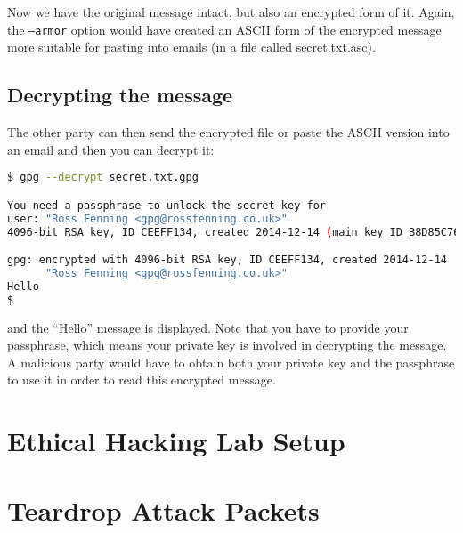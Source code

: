 \documentclass{report}
\begin{document}
Now we have the original message intact, but also an encrypted form of it.
Again, the \texttt{--armor} option would have created an ASCII form of
the encrypted message more suitable for pasting into emails (in a file
called secret.txt.asc).

\section{Decrypting the message}

The other party can then send the encrypted file or paste the ASCII version into
an email and then you can decrypt it:

\begin{lstlisting}[language=bash]
$ gpg --decrypt secret.txt.gpg

You need a passphrase to unlock the secret key for
user: "Ross Fenning <gpg@rossfenning.co.uk>"
4096-bit RSA key, ID CEEFF134, created 2014-12-14 (main key ID B8D85C76)

gpg: encrypted with 4096-bit RSA key, ID CEEFF134, created 2014-12-14
      "Ross Fenning <gpg@rossfenning.co.uk>"
Hello
$
\end{lstlisting}

\noindent and the ``Hello'' message is displayed. Note that you have to
provide your passphrase, which means your private key is involved in
decrypting the message. A malicious party would have to obtain both
your private key and the passphrase to use it in order to read this
encrypted message.

\chapter{Ethical Hacking Lab Setup}


\appendix

\chapter{Teardrop Attack Packets}
\label{appendix:packets}


\pagebreak

\end{document}
